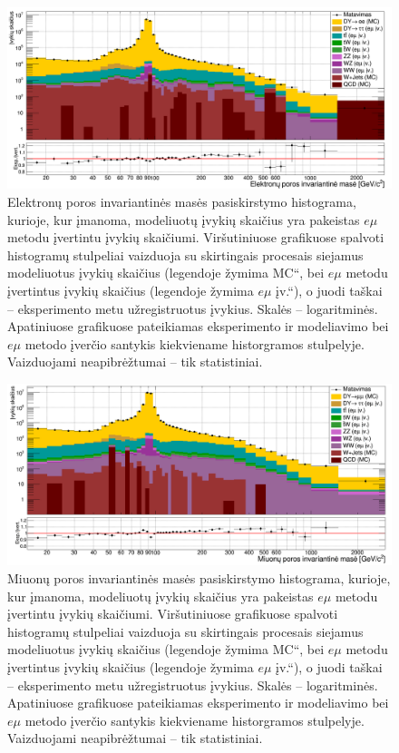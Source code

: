 \documentclass[a4paper, 12pt]{article}
\newcommand{\emu}{e\mu}
\newcommand{\ltq}[1]{{\quotedblbase{}#1\textquotedblleft{}}}
\newlength\q
\begin{document}
\begin{figure}
	\includegraphics[width=\linewidth]{eeMassFinal_BIG.png}
	\caption{\label{fig:eeMassDataMCest} \small
		Elektronų poros invariantinės masės pasiskirstymo histograma, kurioje, kur įmanoma, modeliuotų įvykių skaičius yra
		pakeistas $\emu$ metodu įvertintu įvykių skaičiumi. 
		Viršutiniuose grafikuose spalvoti histogramų stulpeliai vaizduoja su skirtingais procesais siejamus modeliuotus įvykių
		skaičius (legendoje žymima \ltq{MC}, bei $\emu$ metodu įvertintus įvykių skaičius (legendoje žymima \ltq{$\emu$ įv.}),
		o juodi taškai -- eksperimento metu užregistruotus įvykius.
		Skalės -- logaritminės.
		Apatiniuose grafikuose pateikiamas eksperimento ir modeliavimo bei $\emu$ metodo įverčio santykis kiekviename
		historgramos stulpelyje.
		Vaizduojami neapibrėžtumai -- tik statistiniai.
	}
\end{figure}

\begin{figure}
	\includegraphics[width=\linewidth]{mumuMassFinal_BIG.png}
	\caption{\label{fig:mumuMassDataMCest} \small
		Miuonų poros invariantinės masės pasiskirstymo histograma, kurioje, kur įmanoma, modeliuotų įvykių skaičius yra
		pakeistas $\emu$ metodu įvertintu įvykių skaičiumi. 
		Viršutiniuose grafikuose spalvoti histogramų stulpeliai vaizduoja su skirtingais procesais siejamus modeliuotus įvykių
		skaičius (legendoje žymima \ltq{MC}, bei $\emu$ metodu įvertintus įvykių skaičius (legendoje žymima \ltq{$\emu$ įv.}),
		o juodi taškai -- eksperimento metu užregistruotus įvykius.
		Skalės -- logaritminės.
		Apatiniuose grafikuose pateikiamas eksperimento ir modeliavimo bei $\emu$ metodo įverčio santykis kiekviename
		historgramos stulpelyje.
		Vaizduojami neapibrėžtumai -- tik statistiniai.
	}
\end{figure}
\end{document}
